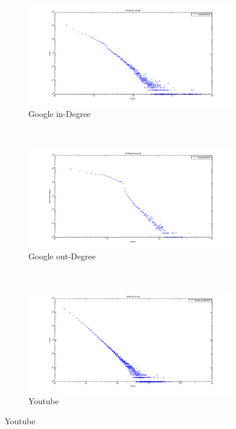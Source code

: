 \begin{figure}
    \centering
    \begin{subfigure}[htbp]{0.9\textwidth}
            \includegraphics[width=\textwidth]{FIG/dd-google-in.png}
            \caption{Google in-Degree}
            \label{fig:dd-google-in}
    \end{subfigure}
    ~ %
    \begin{subfigure}[htbp]{0.9\textwidth}
            \includegraphics[width=\textwidth]{FIG/dd-google-out.png}
            \caption{Google out-Degree}
            \label{fig:dd-google-out}
    \end{subfigure}
    ~ %
    \begin{subfigure}[htbp]{0.9\textwidth}
            \includegraphics[width=\textwidth]{FIG/dd-youtube.png}
            \caption{Youtube}
            \label{fig:dd-youtube}
    \end{subfigure}
\end{figure} 

